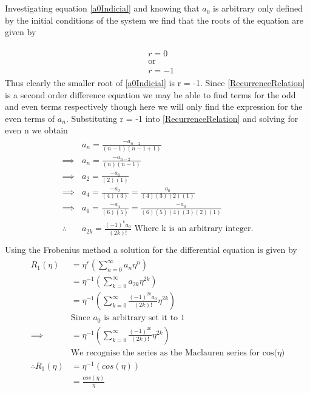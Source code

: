 \documentclass[10pt]{article}
\numberwithin{equation}{section}
\begin{document}
		\section{}
		Investigating equation \ref{a0Indicial} and knowing that \(a_0\) is arbitrary only defined by the initial conditions of the system we find that the roots of the equation are given by 
		
		\begin{align*}
			\begin{split}
				&r = 0\\
				&\text{or}\\
				&r = -1
			\end{split}
		\end{align*}
		Thus clearly the smaller root of \ref{a0Indicial} is r = -1. Since \ref{RecurrenceRelation} is a second order difference equation we may be able to find terms for the odd and even terms respectively though here we will only find the expression for the even terms of \(a_n\).
	Substituting r = -1 into \ref{RecurrenceRelation} and solving for even n we obtain
		\begin{align}\label{evenAk}
			\begin{split}
				&a_n = \frac{-a_{n-2}}{(n-1)(n-1+1)}\\
				\implies&a_n = \frac{-a_{n-2}}{(n)(n-1)}\\
				\implies&a_2 = \frac{-a_{0}}{(2)(1)} \\
				\implies&a_4 = \frac{-a_{2}}{(4)(3)} = \frac{a_{0}}{(4)(3)(2)(1)}\\
				\implies&a_6 = \frac{-a_{4}}{(6)(5)} = \frac{-a_{0}}{(6)(5)(4)(3)(2)(1)}\\
				\therefore\quad&a_{2k} = \frac{(-1)^{k}a_{0}}{(2k)!}
				\text{   Where k is an arbitrary integer.}\\
			\end{split}
		\end{align}
		Using the Frobenius method a solution for the differential equation is given by
		\begin{align}
			\begin{split}
				R_1(\eta) &= \eta^r\left(\sum_{n=0}^{\infty}a_{n}\eta^n\right)\\
				&= \eta^{-1}\left(\sum_{k=0}^{\infty}a_{2k}\eta^{2k}\right)\\
				&= \eta^{-1}\left(\sum_{k=0}^{\infty}\frac{(-1)^{2k}a_{0}}{(2k)!}\eta^{2k}\right)\\
				&\text{Since \(a_0\) is arbitrary set it to 1}\\
				\implies&= \eta^{-1}\left(\sum_{k=0}^{\infty}\frac{(-1)^{2k}}{(2k)!}\eta^{2k}\right)\\
				&\text{We recognise the series as the Maclauren series for cos(\(\eta\))}\\
				\therefore R_1(\eta) & = \eta^{-1}\left(cos(\eta)\right)\\
				&= \frac{cos(\eta)}{\eta} 
			\end{split}
		\end{align}
\end{document}
